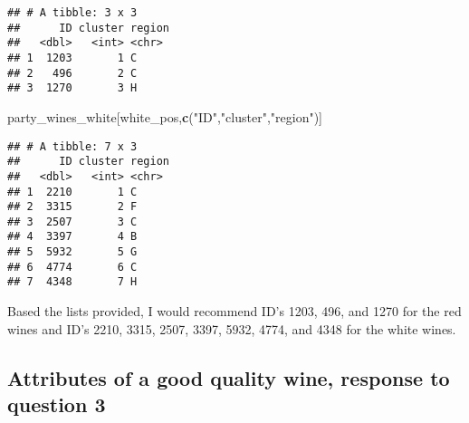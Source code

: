 \documentclass[
]{article}
\newenvironment{Shaded}{\begin{snugshade}}{\end{snugshade}}
\newcommand{\KeywordTok}[1]{\textcolor[rgb]{0.13,0.29,0.53}{\textbf{#1}}}
\newcommand{\NormalTok}[1]{#1}
\newcommand{\StringTok}[1]{\textcolor[rgb]{0.31,0.60,0.02}{#1}}
\begin{document}
\begin{verbatim}
## # A tibble: 3 x 3
##      ID cluster region
##   <dbl>   <int> <chr> 
## 1  1203       1 C     
## 2   496       2 C     
## 3  1270       3 H
\end{verbatim}

\begin{Shaded}
\begin{Highlighting}[]
\NormalTok{party_wines_white[white_pos,}\KeywordTok{c}\NormalTok{(}\StringTok{"ID"}\NormalTok{,}\StringTok{"cluster"}\NormalTok{,}\StringTok{"region"}\NormalTok{)]}
\end{Highlighting}
\end{Shaded}

\begin{verbatim}
## # A tibble: 7 x 3
##      ID cluster region
##   <dbl>   <int> <chr> 
## 1  2210       1 C     
## 2  3315       2 F     
## 3  2507       3 C     
## 4  3397       4 B     
## 5  5932       5 G     
## 6  4774       6 C     
## 7  4348       7 H
\end{verbatim}

Based the lists provided, I would recommend ID's 1203, 496, and 1270 for
the red wines and ID's 2210, 3315, 2507, 3397, 5932, 4774, and 4348 for
the white wines.

\hypertarget{attributes-of-a-good-quality-wine-response-to-question-3}{%
\subsection{Attributes of a good quality wine, response to question
3}\label{attributes-of-a-good-quality-wine-response-to-question-3}}
\end{document}
